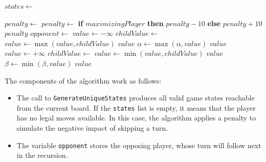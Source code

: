 \begin{algorithm}[H]
\caption{Minimax for Dice Outcome}
\label{alg:minimaxfordice}
\begin{algorithmic}[1]
    \State $states \gets$ 

        \State $penalty \gets$ 
        \State $penalty \gets$ \textbf{if} $maximizingPlayer$ \textbf{then} $penalty - 10$ \textbf{else} $penalty + 10$
        \State \Return $penalty$
    \EndIf
\State $opponent \gets$ 
        \State $value \gets -\infty$
            \State $childValue \gets$ 
            \State $value \gets \max(value, childValue)$
                \State \Return $value$ 
            \EndIf
            \State $\alpha \gets \max(\alpha, value)$
        \EndFor
        \State \Return $value$
    \Else
        \State $value \gets +\infty$
            \State $childValue \gets$ 
            \State $value \gets \min(value, childValue)$
                \State \Return $value$ 
            \EndIf
            \State $\beta \gets \min(\beta, value)$
        \EndFor
        \State \Return $value$
    \EndIf
\EndFunction
\end{algorithmic}
\end{algorithm}

The components of the algorithm work as follows:

\begin{itemize}
    \item The call to \texttt{GenerateUniqueStates} produces all valid game states reachable from the current board. If the \texttt{states} list is empty, it means that the player has no legal moves available. In this case, the algorithm applies a penalty to simulate the negative impact of skipping a turn.

    \item The variable \texttt{opponent} stores the opposing player, whose turn will follow next in the recursion.
\end{itemize}

